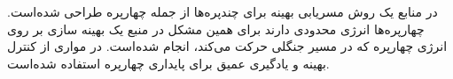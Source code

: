 در منابع \cite{Lee2017} \cite{8396617} یک روش مسریابی بهینه برای چندپره‌ها از جمله چهارپره طراحی شده‌است. چهارپره‌ها انرژی محدودی دارند برای همین مشکل در منبع \cite{9029345} یک بهینه سازی بر روی انرژی چهارپره که در مسیر جنگلی حرکت می‌کند، انجام شده‌است. در مواری \cite{DBLP:journals/corr/abs-1912-07067}از کنترل بهینه و یادگیری عمیق  برای پایداری چهارپره استفاده شده‌است.

